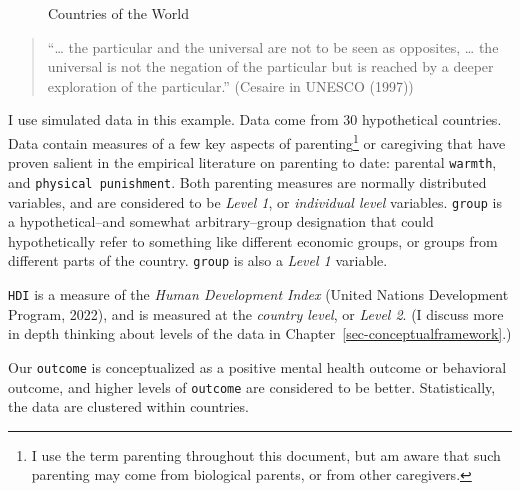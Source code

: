 \documentclass[
  letterpaper,
  DIV=11,
  numbers=noendperiod]{scrreprt}
\begin{document}
\begin{figure}


\caption{\label{fig-world}Countries of the World}

\end{figure}%

\begin{quote}
``\ldots{} the particular and the universal are not to be seen as
opposites, \ldots{} the universal is not the negation of the particular
but is reached by a deeper exploration of the particular.'' (Cesaire in
UNESCO (1997))
\end{quote}

I use simulated data in this example. Data come from 30 hypothetical
countries. Data contain measures of a few key aspects of
parenting\footnote{I use the term parenting throughout this document,
  but am aware that such parenting may come from biological parents, or
  from other caregivers.} or caregiving that have proven salient in the
empirical literature on parenting to date: parental \texttt{warmth}, and
\texttt{physical\ punishment}. Both parenting measures are normally
distributed variables, and are considered to be \emph{Level 1}, or
\emph{individual level} variables. \texttt{group} is a hypothetical--and
somewhat arbitrary--group designation that could hypothetically refer to
something like different economic groups, or groups from different parts
of the country. \texttt{group} is also a \emph{Level 1} variable.

\texttt{HDI} is a measure of the \emph{Human Development Index} (United
Nations Development Program, 2022), and is measured at the \emph{country
level}, or \emph{Level 2}. (I discuss more in depth thinking about
levels of the data in Chapter~\ref{sec-conceptualframework}.)

Our \texttt{outcome} is conceptualized as a positive mental health
outcome or behavioral outcome, and higher levels of \texttt{outcome} are
considered to be better. Statistically, the data are clustered within
countries.
\end{document}

